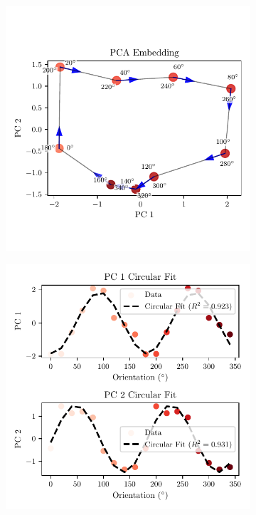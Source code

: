 \documentclass[11pt,a4paper]{article}
\begin{document}
\begin{figure}[h!]
    \centering
    \begin{subfigure}[b]{0.48\textwidth}
        \centering
        \includegraphics[width=\textwidth]{results/ann_circular_colormap_visualization.pdf}
        \label{fig:circular_colormap}
    \end{subfigure}
    \hfill
    \begin{subfigure}[b]{0.48\textwidth}
        \centering
        \includegraphics[width=\textwidth]{results/ann_circular_regression.pdf}

\end{subfigure}
\end{figure}
\end{document}
